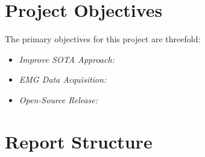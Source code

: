 \section{Project Objectives}

The primary objectives for this project are threefold:

\begin{itemize}
    \item \textit{Improve SOTA Approach:}
    \item \textit{EMG Data Acquisition:}
    \item \textit{Open-Source Release:}
\end{itemize}

\section{Report Structure}